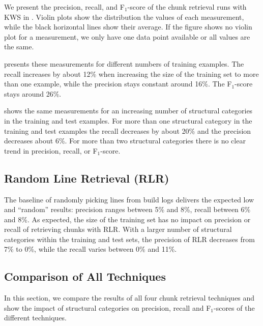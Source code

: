 We present the precision,
recall, and F$_{1}$-score of the chunk retrieval runs with KWS in
.
Violin plots show the distribution the values of each measurement,
while the black horizontal lines show their average.
If the figure shows no violin plot for a measurement, we only have one
data point available or all values are the same.

 presents these
measurements for different
numbers of training examples.
The recall increases by about 12\% when
increasing the size of the training set to more than one example,
while the precision stays constant around 16\%.
The F$_{1}$-score
stays around 26\%.

 shows the same
measurements for an increasing number of structural categories in the
training and test examples.
For more than one structural category in
the training and test examples the recall decreases by about 20\% and
the precision decreases about 6\%.
For more than two structural
categories there is no clear trend in precision, recall, or
F$_{1}$-score.

\subsection{Random Line Retrieval (RLR)}
\label{sec:r:rlr}
The baseline of randomly
picking lines from build logs delivers the expected low and
``random'' results: precision ranges between 5\% and 8\%,
recall between 6\% and 8\%.
As expected, the size of the training set has no impact on precision
or recall of retrieving chunks with RLR.
With a larger number of structural categories within the training and
test sets, the precision of RLR decreases from 7\% to 0\%, while
the recall varies between 0\% and 11\%.

\subsection{Comparison of All Techniques}
In this section, we compare the results of all four chunk retrieval
techniques and show the impact of structural categories on precision,
recall and F$_{1}$-scores of the different techniques.

